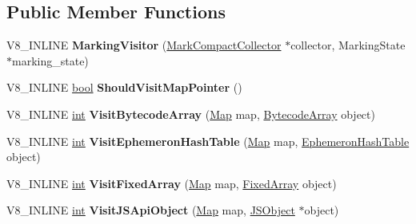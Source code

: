 \subsection*{Public Member Functions}
\begin{DoxyCompactItemize}
\item 
\mbox{\label{classv8_1_1internal_1_1MarkingVisitor_a5e8fa1b9cd86dc45eae24a3be21f3edd}} 
V8\+\_\+\+I\+N\+L\+I\+NE {\bfseries Marking\+Visitor} (\mbox{\hyperlink{classv8_1_1internal_1_1MarkCompactCollector}{Mark\+Compact\+Collector}} $\ast$collector, Marking\+State $\ast$marking\+\_\+state)
\item 
\mbox{\label{classv8_1_1internal_1_1MarkingVisitor_a893a7477e401156509fef81ecdfb8abc}} 
V8\+\_\+\+I\+N\+L\+I\+NE \mbox{\hyperlink{classbool}{bool}} {\bfseries Should\+Visit\+Map\+Pointer} ()
\item 
\mbox{\label{classv8_1_1internal_1_1MarkingVisitor_adfdf7a62d5b64a0c8903b8e63e06c41e}} 
V8\+\_\+\+I\+N\+L\+I\+NE \mbox{\hyperlink{classint}{int}} {\bfseries Visit\+Bytecode\+Array} (\mbox{\hyperlink{classv8_1_1internal_1_1Map}{Map}} map, \mbox{\hyperlink{classv8_1_1internal_1_1BytecodeArray}{Bytecode\+Array}} object)
\item 
\mbox{\label{classv8_1_1internal_1_1MarkingVisitor_ac050d7ff7e529391387c0c0e9586640d}} 
V8\+\_\+\+I\+N\+L\+I\+NE \mbox{\hyperlink{classint}{int}} {\bfseries Visit\+Ephemeron\+Hash\+Table} (\mbox{\hyperlink{classv8_1_1internal_1_1Map}{Map}} map, \mbox{\hyperlink{classv8_1_1internal_1_1EphemeronHashTable}{Ephemeron\+Hash\+Table}} object)
\item 
\mbox{\label{classv8_1_1internal_1_1MarkingVisitor_a8cc5cb13ed23cf1cfb611843409273af}} 
V8\+\_\+\+I\+N\+L\+I\+NE \mbox{\hyperlink{classint}{int}} {\bfseries Visit\+Fixed\+Array} (\mbox{\hyperlink{classv8_1_1internal_1_1Map}{Map}} map, \mbox{\hyperlink{classv8_1_1internal_1_1FixedArray}{Fixed\+Array}} object)
\item 
\mbox{\label{classv8_1_1internal_1_1MarkingVisitor_a6604d3c6f113bab5e949046ebf8f0915}} 
V8\+\_\+\+I\+N\+L\+I\+NE \mbox{\hyperlink{classint}{int}} {\bfseries Visit\+J\+S\+Api\+Object} (\mbox{\hyperlink{classv8_1_1internal_1_1Map}{Map}} map, \mbox{\hyperlink{classv8_1_1internal_1_1JSObject}{J\+S\+Object}} $\ast$object)

\end{DoxyCompactItemize}
